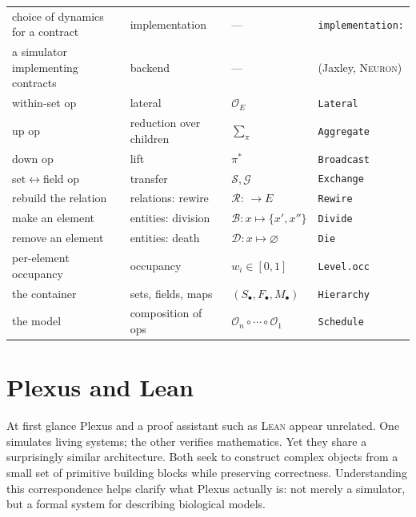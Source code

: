 \documentclass[11pt]{article}
\newcommand{\code}[1]{\texttt{#1}}
\begin{document}
\begin{center}
{\begin{tabular}{@{}lll l@{}}
choice of dynamics for a contract & implementation & ---                     & \code{implementation:} \\
a simulator implementing contracts & backend         & ---                     & (Jaxley, \textsc{Neuron}) \\
within-set op            & lateral              & $\mathcal{O}_E$             & \code{Lateral} \\
up op                    & reduction over children& $\sum_\pi$                & \code{Aggregate} \\
down op                  & lift                 & $\pi^{*}$                   & \code{Broadcast} \\
set$\leftrightarrow$field op & transfer          & $\mathcal{S},\mathcal{G}$   & \code{Exchange} \\
rebuild the relation     & relations: rewire    & $\mathcal{R}\!:\,\to\!E$     & \code{Rewire} \\
make an element          & entities: division   & $\mathcal{B}:x\!\mapsto\!\{x',x''\}$ & \code{Divide} \\
remove an element        & entities: death      & $\mathcal{D}:x\!\mapsto\!\varnothing$ & \code{Die} \\
per-element occupancy     & occupancy            & $w_i\in[0,1]$               & \code{Level.occ} \\
the container            & sets, fields, maps   & $(S_\bullet,F_\bullet,M_\bullet)$ & \code{Hierarchy} \\
the model                & composition of ops   & $\mathcal{O}_n\!\circ\!\cdots\!\circ\!\mathcal{O}_1$ & \code{Schedule} \\
\bottomrule
\end{tabular}}
\end{center}

\section{Plexus and Lean}
\label{sec:lean}

At first glance Plexus and a proof assistant such as \textsc{Lean} appear unrelated.
One simulates living systems; the other verifies mathematics. Yet they share a
surprisingly similar architecture. Both seek to construct complex objects from a
small set of primitive building blocks while preserving correctness. Understanding
this correspondence helps clarify what Plexus actually is: not merely a simulator,
but a formal system for describing biological models.
\end{document}
